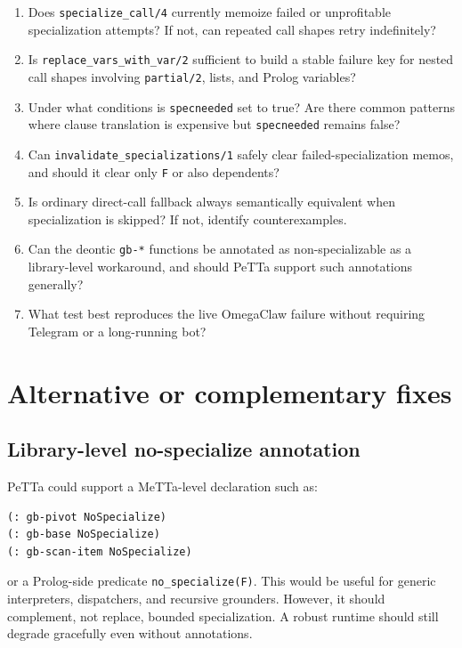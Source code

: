 \documentclass[11pt]{article}
\begin{document}
\begin{enumerate}
\item Does \texttt{specialize\_call/4} currently memoize failed or unprofitable specialization attempts? If not, can repeated call shapes retry indefinitely?
\item Is \texttt{replace\_vars\_with\_var/2} sufficient to build a stable failure key for nested call shapes involving \texttt{partial/2}, lists, and Prolog variables?
\item Under what conditions is \texttt{specneeded} set to true? Are there common patterns where clause translation is expensive but \texttt{specneeded} remains false?
\item Can \texttt{invalidate\_specializations/1} safely clear failed-specialization memos, and should it clear only \texttt{F} or also dependents?
\item Is ordinary direct-call fallback always semantically equivalent when specialization is skipped? If not, identify counterexamples.
\item Can the deontic \texttt{gb-*} functions be annotated as non-specializable as a library-level workaround, and should PeTTa support such annotations generally?
\item What test best reproduces the live OmegaClaw failure without requiring Telegram or a long-running bot?
\end{enumerate}

\section{Alternative or complementary fixes}

\subsection{Library-level no-specialize annotation}

PeTTa could support a MeTTa-level declaration such as:

\begin{lstlisting}
(: gb-pivot NoSpecialize)
(: gb-base NoSpecialize)
(: gb-scan-item NoSpecialize)
\end{lstlisting}

or a Prolog-side predicate \texttt{no\_specialize(F)}. This would be useful for generic interpreters, dispatchers, and recursive grounders. However, it should complement, not replace, bounded specialization. A robust runtime should still degrade gracefully even without annotations.
\end{document}
